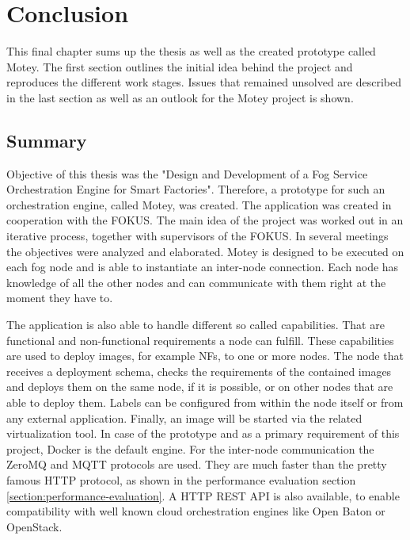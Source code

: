\chapter{Conclusion}
\label{chapter:conclusion}
\minitoc\vspace{.5cm}
This final chapter sums up the thesis as well as the created prototype called Motey.
The first section outlines the initial idea behind the project and reproduces the different work stages.
Issues that remained unsolved are described in the last section as well as an outlook for the Motey project is shown.

\section{Summary}
Objective of this thesis was the "Design and Development of a Fog Service Orchestration Engine for Smart Factories".
Therefore, a prototype for such an orchestration engine, called Motey, was created.
The application was created in cooperation with the \acf{FOKUS}.
The main idea of the project was worked out in an iterative process, together with supervisors of the \ac{FOKUS}.
In several meetings the objectives were analyzed and elaborated.
Motey is designed to be executed on each fog node and is able to instantiate an inter-node connection.
Each node has knowledge of all the other nodes and can communicate with them right at the moment they have to.\newline

The application is also able to handle different so called capabilities.
That are functional and non-functional requirements a node can fulfill.
These capabilities are used to deploy images, for example \acp{NF}, to one or more nodes.
The node that receives a deployment schema, checks the requirements of the contained images and deploys them on the same node, if it is possible, or on other nodes that are able to deploy them.
Labels can be configured from within the node itself or from any external application.
Finally, an image will be started via the related virtualization tool.
In case of the prototype and as a primary requirement of this project, Docker is the default engine.
For the inter-node communication the ZeroMQ and \ac{MQTT} protocols are used.
They are much faster than the pretty famous \ac{HTTP} protocol, as shown in the performance evaluation section \ref{section:performance-evaluation}.
A \ac{HTTP} \ac{REST} \ac{API} is also available, to enable compatibility with well known cloud orchestration engines like Open Baton or OpenStack.


